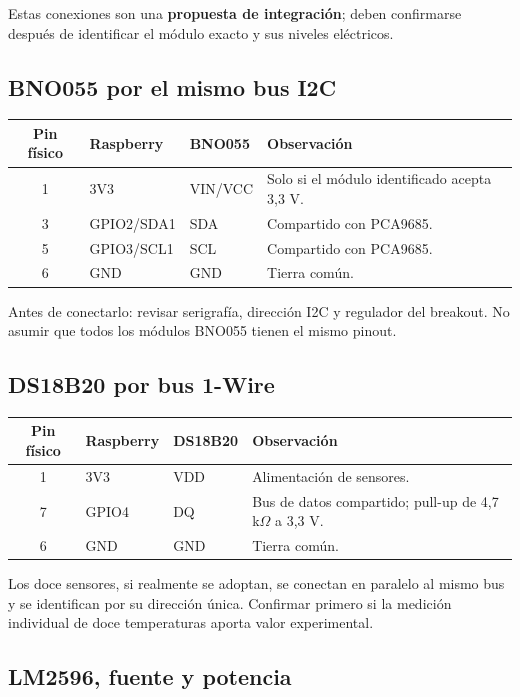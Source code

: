 \documentclass[11pt,a4paper]{article}
\begin{document}
Estas conexiones son una \textbf{propuesta de integración}; deben confirmarse después de identificar el módulo exacto y sus niveles eléctricos.

\subsection{BNO055 por el mismo bus I2C}

\begin{tabularx}{\textwidth}{c l l X}
\toprule
\textbf{Pin físico} & \textbf{Raspberry} & \textbf{BNO055} & \textbf{Observación}\\
\midrule
1 & 3V3 & VIN/VCC & Solo si el módulo identificado acepta 3,3 V.\\
3 & GPIO2/SDA1 & SDA & Compartido con PCA9685.\\
5 & GPIO3/SCL1 & SCL & Compartido con PCA9685.\\
6 & GND & GND & Tierra común.\\
\bottomrule
\end{tabularx}

Antes de conectarlo: revisar serigrafía, dirección I2C y regulador del breakout. No asumir que todos los módulos BNO055 tienen el mismo pinout.

\subsection{DS18B20 por bus 1-Wire}

\begin{tabularx}{\textwidth}{c l l X}
\toprule
\textbf{Pin físico} & \textbf{Raspberry} & \textbf{DS18B20} & \textbf{Observación}\\
\midrule
1 & 3V3 & VDD & Alimentación de sensores.\\
7 & GPIO4 & DQ & Bus de datos compartido; pull-up de 4,7 k$\Omega$ a 3,3 V.\\
6 & GND & GND & Tierra común.\\
\bottomrule
\end{tabularx}

Los doce sensores, si realmente se adoptan, se conectan en paralelo al mismo bus y se identifican por su dirección única. Confirmar primero si la medición individual de doce temperaturas aporta valor experimental.

\subsection{LM2596, fuente y potencia}
\end{document}
